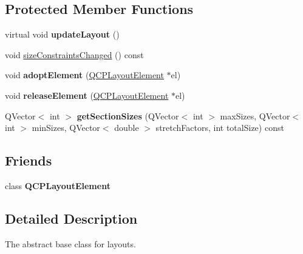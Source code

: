 \subsection*{\-Protected \-Member \-Functions}
\begin{DoxyCompactItemize}
\item 
\hypertarget{classQCPLayout_a165c77f6287ac92e8d03017ad913378b}{virtual void {\bfseries update\-Layout} ()}\label{classQCPLayout_a165c77f6287ac92e8d03017ad913378b}

\item 
void \hyperlink{classQCPLayout_a6218cd7e5c0e30077c1aeaffe55b6145}{size\-Constraints\-Changed} () const 
\item 
\hypertarget{classQCPLayout_af6dbbc24156a808da29cd1ec031729a3}{void {\bfseries adopt\-Element} (\hyperlink{classQCPLayoutElement}{\-Q\-C\-P\-Layout\-Element} $\ast$el)}\label{classQCPLayout_af6dbbc24156a808da29cd1ec031729a3}

\item 
\hypertarget{classQCPLayout_a4afbb4bef0071f72f91afdac4433a18e}{void {\bfseries release\-Element} (\hyperlink{classQCPLayoutElement}{\-Q\-C\-P\-Layout\-Element} $\ast$el)}\label{classQCPLayout_a4afbb4bef0071f72f91afdac4433a18e}

\item 
\hypertarget{classQCPLayout_a92d9dcd95e9510b323706ef7fc4ff62e}{\-Q\-Vector$<$ int $>$ {\bfseries get\-Section\-Sizes} (\-Q\-Vector$<$ int $>$ max\-Sizes, \-Q\-Vector$<$ int $>$ min\-Sizes, \-Q\-Vector$<$ double $>$ stretch\-Factors, int total\-Size) const }\label{classQCPLayout_a92d9dcd95e9510b323706ef7fc4ff62e}

\end{DoxyCompactItemize}
\subsection*{\-Friends}
\begin{DoxyCompactItemize}
\item 
\hypertarget{classQCPLayout_a0790750c7e7f14fdbd960d172655b42b}{class {\bfseries \-Q\-C\-P\-Layout\-Element}}\label{classQCPLayout_a0790750c7e7f14fdbd960d172655b42b}

\end{DoxyCompactItemize}


\subsection{\-Detailed \-Description}
\-The abstract base class for layouts. 


